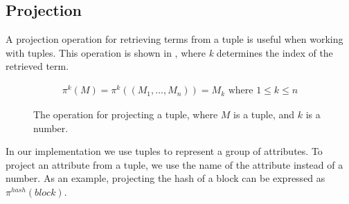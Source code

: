 \subsection{Projection}
A projection operation for retrieving terms from a tuple is useful when working with tuples. This operation is shown in , where \textit{k} determines the index of the retrieved term.
\begin{figure}[h]
    \begin{align*}
        \pi^k(M)=\pi^k((M_1,..., M_n))=M_k \text{ where } 1\leq k \leq n
    \end{align*}
    \caption{The operation for projecting a tuple, where $M$ is a tuple, and $k$ is a number.}
\label{tupleop}
\end{figure}

In our implementation we use tuples to represent a group of attributes. To project an attribute from a tuple, we use the name of the attribute instead of a number. As an example, projecting the hash of a block can be expressed as $\pi^{hash}(block)$.
\FloatBarrier
